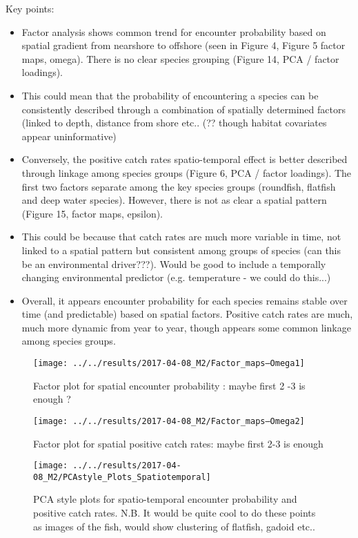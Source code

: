 \documentclass[11pt]{article}
\begin{document}
Key points:
\begin{itemize}
	\item Factor analysis shows common trend for encounter probability
		based on spatial gradient from nearshore to offshore (seen in
		Figure 4, Figure 5 factor maps, omega). There is no clear species
		grouping (Figure 14, PCA / factor loadings). 
	\item This could mean that the probability of encountering a species
		can be consistently described through a combination of
		spatially determined factors (linked to depth, distance from
		shore etc.. (?? though habitat covariates appear uninformative) 
	\item Conversely, the positive catch rates spatio-temporal effect is
		better described through linkage among species groups (Figure
		6, PCA / factor loadings). The first two factors separate among
		the key species groups (roundfish, flatfish and deep water
		species). However, there is not as clear a spatial pattern
		(Figure 15, factor maps, epsilon).
	\item 	This could be because that catch rates are much more variable
		in time, not linked to a spatial pattern but consistent among
		groups of species (can this be an environmental driver???).
		Would be good to include a temporally changing environmental
		predictor (e.g. temperature - we could do this...) 
	\item  Overall, it appears encounter probability for each species
		remains stable over time (and predictable) based on spatial
		factors.  Positive catch rates are much, much more dynamic from
		year to year, though appears some common linkage among species
		groups.
\end{itemize}


\begin{figure}[!ht]
	\texttt{[image: ../../results/2017-04-08\_M2/Factor\_maps--Omega1]}
	\label{fig:FactMap1}
	\caption{Factor plot for spatial encounter probability : maybe first 2
	-3 is enough ?}
\end{figure}

\begin{figure}[!ht]
	\texttt{[image: ../../results/2017-04-08\_M2/Factor\_maps--Omega2]}
	\label{fig:FactMap2}
	\caption{Factor plot for spatial positive catch rates: maybe first 2-3
	is enough}
\end{figure}

\begin{figure}[!ht]
	\texttt{[image: ../../results/2017-04-08\_M2/PCAstyle\_Plots\_Spatiotemporal]}
	\label{fig:PCA2}
	\caption{PCA style plots for spatio-temporal encounter probability and
		positive catch rates. N.B. It would be quite cool to do these
		points as images of the fish, would show clustering of
		flatfish, gadoid etc..}
\end{figure}
\end{document}
